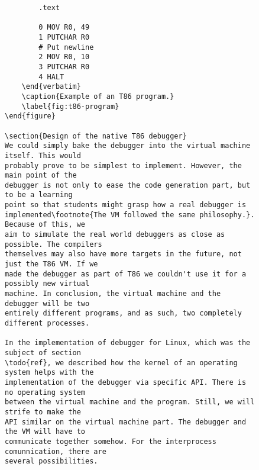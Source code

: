 \begin{figure}
    \begin{lstlisting}
        .text

        0 MOV R0, 49
        1 PUTCHAR R0
        # Put newline
        2 MOV R0, 10
        3 PUTCHAR R0
        4 HALT
    \end{verbatim}
    \caption{Example of an T86 program.}
    \label{fig:t86-program}
\end{figure}

\section{Design of the native T86 debugger}
We could simply bake the debugger into the virtual machine itself. This would
probably prove to be simplest to implement. However, the main point of the
debugger is not only to ease the code generation part, but to be a learning
point so that students might grasp how a real debugger is
implemented\footnote{The VM followed the same philosophy.}. Because of this, we
aim to simulate the real world debuggers as close as possible. The compilers
themselves may also have more targets in the future, not just the T86 VM. If we
made the debugger as part of T86 we couldn't use it for a possibly new virtual
machine. In conclusion, the virtual machine and the debugger will be two
entirely different programs, and as such, two completely different processes.

In the implementation of debugger for Linux, which was the subject of section
\todo{ref}, we described how the kernel of an operating system helps with the
implementation of the debugger via specific API. There is no operating system
between the virtual machine and the program. Still, we will strife to make the
API similar on the virtual machine part. The debugger and the VM will have to
communicate together somehow. For the interprocess comunnication, there are
several possibilities.


\end{lstlisting}
\end{figure}
